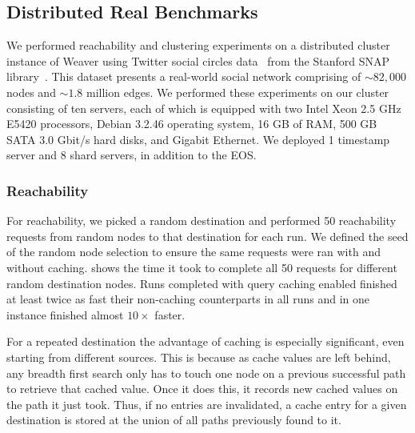 \documentclass[letterpaper,twocolumn,11pt,tight]{article}
\begin{document}
\subsection{Distributed Real Benchmarks}

We performed reachability and clustering experiments on a distributed cluster instance of Weaver using Twitter social circles data~\cite{twitter_data} from the Stanford SNAP library~\cite{snap}.
This dataset presents a real-world social network comprising of $\sim 82,000$ nodes and $\sim 1.8$ million edges.
We performed these experiments on our cluster consisting of ten servers, each of which is equipped with two Intel Xeon 2.5 GHz E5420 processors, Debian 3.2.46 operating system, 16 GB of RAM, 500 GB SATA 3.0 Gbit/s hard disks, and Gigabit Ethernet.
We deployed 1 timestamp server and 8 shard servers, in addition to the EOS.

\subsubsection{Reachability}
For reachability, we picked a random destination and performed 50 reachability requests from random nodes to that destination for each run. We defined the seed of the random node selection to ensure the same requests were ran with and without caching.  shows the time it took to complete all 50 requests for different random destination nodes. Runs completed with query caching enabled finished at least twice as fast their non-caching counterparts in all runs and in one instance finished almost $10\times$ faster.

For a repeated destination the advantage of caching is especially significant, even starting from different sources. This is because as cache values are left behind, any breadth first search only has to touch one node on a previous successful path to retrieve that cached value. Once it does this, it records new cached values on the path it just took. Thus, if no entries are invalidated, a cache entry for a given destination is stored at the union of all paths previously found to it.

\end{document}
